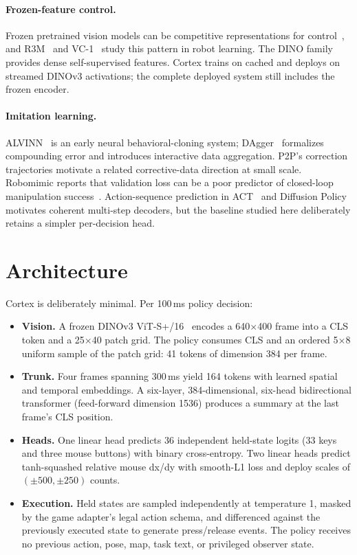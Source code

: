 \documentclass[11pt]{article}
\newcommand{\x}{\ensuremath{\times}}
\begin{document}
\paragraph{Frozen-feature control.} Frozen pretrained vision models can be competitive representations for control~\cite{pvr}, and R3M~\cite{r3m} and VC-1~\cite{vc1} study this pattern in robot learning. The DINO family~\cite{dino,dinov2,dinov3} provides dense self-supervised features. Cortex trains on cached and deploys on streamed DINOv3 activations; the complete deployed system still includes the frozen encoder.

\paragraph{Imitation learning.} ALVINN~\cite{alvinn} is an early neural behavioral-cloning system; DAgger~\cite{dagger} formalizes compounding error and introduces interactive data aggregation. P2P's correction trajectories motivate a related corrective-data direction at small scale. Robomimic reports that validation loss can be a poor predictor of closed-loop manipulation success~\cite{robomimic}. Action-sequence prediction in ACT~\cite{act} and Diffusion Policy~\cite{diffusionpolicy} motivates coherent multi-step decoders, but the baseline studied here deliberately retains a simpler per-decision head.

\section{Architecture}\label{sec:arch}

Cortex is deliberately minimal. Per 100\,ms policy decision:
\begin{itemize}
\item \textbf{Vision.} A frozen DINOv3 ViT-S+/16~\cite{dinov3} encodes a 640\x400 frame into a CLS token and a 25\x40 patch grid. The policy consumes CLS and an ordered 5\x8 uniform sample of the patch grid: 41 tokens of dimension 384 per frame.
\item \textbf{Trunk.} Four frames spanning 300\,ms yield 164 tokens with learned spatial and temporal embeddings. A six-layer, 384-dimensional, six-head bidirectional transformer (feed-forward dimension 1536) produces a summary at the last frame's CLS position.
\item \textbf{Heads.} One linear head predicts 36 independent held-state logits (33 keys and three mouse buttons) with binary cross-entropy. Two linear heads predict tanh-squashed relative mouse dx/dy with smooth-L1 loss and deploy scales of $(\pm500,\pm250)$ counts.
\item \textbf{Execution.} Held states are sampled independently at temperature 1, masked by the game adapter's legal action schema, and differenced against the previously executed state to generate press/release events. The policy receives no previous action, pose, map, task text, or privileged observer state.
\end{itemize}
\end{document}
